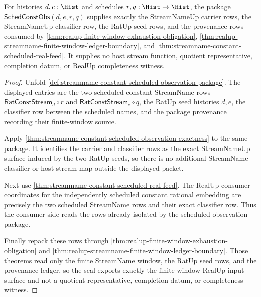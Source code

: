 \begin{theorem}
\label{thm:streamname-scheduled-constant-realup-seal-exactness}
For histories $d,e:\Hist$ and schedules $r,q:\Hist\to\Hist$, the package
$\mathsf{SchedConstObs}(d,e,r,q)$ supplies exactly the StreamNameUp carrier
rows, the StreamNameUp classifier row, the RatUp seed rows, and the provenance
rows consumed by
\autoref{thm:realup-finite-window-exhaustion-obligation},
\autoref{thm:realup-streamname-finite-window-ledger-boundary}, and
\autoref{thm:streamname-constant-scheduled-real-feed}. It supplies no host
stream function, quotient representative, completion datum, or RealUp
completeness witness.
\end{theorem}
\begin{proof}
Unfold \autoref{def:streamname-constant-scheduled-observation-package}. The
displayed entries are the two scheduled constant StreamName rows
$\mathsf{RatConstStream}_d\circ r$ and
$\mathsf{RatConstStream}_e\circ q$, the RatUp seed histories $d,e$, the
classifier row between the scheduled names, and the package provenance
recording their finite-window source.

Apply \autoref{thm:streamname-constant-scheduled-observation-exactness} to the
same package. It identifies the carrier and classifier rows as the exact
StreamNameUp surface induced by the two RatUp seeds, so there is no additional
StreamName classifier or host stream map outside the displayed packet.

Next use \autoref{thm:streamname-constant-scheduled-real-feed}. The RealUp
consumer coordinates for the independently scheduled constant rational
embedding are precisely the two scheduled StreamName rows and their exact
classifier row. Thus the consumer side reads the rows already isolated by the
scheduled observation package.

Finally repack these rows through
\autoref{thm:realup-finite-window-exhaustion-obligation} and
\autoref{thm:realup-streamname-finite-window-ledger-boundary}. Those theorems
read only the finite StreamName window, the RatUp seed rows, and the
provenance ledger, so the seal exports exactly the finite-window RealUp input
surface and not a quotient representative, completion datum, or completeness
witness.
\end{proof}

